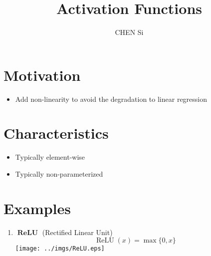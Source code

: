 \documentclass[12pt, a4paper]{article}
\title{Activation Functions}
\author{CHEN Si}
\date{}
\def\relu{\operatorname{ReLU}}
\begin{document}
 

\maketitle


\section{Motivation}

    \begin{itemize}
        \item Add non-linearity to avoid the degradation to linear regression
    \end{itemize}


\section{Characteristics}

    \begin{itemize}
        \item Typically element-wise
        \item Typically non-parameterized
    \end{itemize}


\section{Examples}

    \begin{enumerate}
        \item $\boldsymbol{\relu}$ (Rectified Linear Unit) \\ 
            \[
                \relu(x) = \max \{0, x\}  
            \]
            \texttt{[image: ../imgs/ReLU.eps]}
    \end{enumerate}
\end{document}
